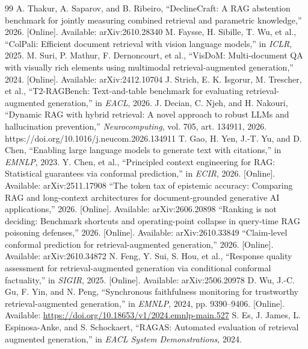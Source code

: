 \documentclass[conference]{IEEEtran}
\begin{document}
\begin{thebibliography}{99}
 A. Thakur, A. Saparov, and B. Ribeiro, ``DeclineCraft: A RAG abstention benchmark for jointly measuring combined retrieval and parametric knowledge,'' 2026. [Online]. Available: arXiv:2610.28340
 M. Faysse, H. Sibille, T. Wu, et al., ``ColPali: Efficient document retrieval with vision language models,'' in \emph{ICLR}, 2025.
 M. Suri, P. Mathur, F. Dernoncourt, et al., ``VisDoM: Multi-document QA with visually rich elements using multimodal retrieval-augmented generation,'' 2024. [Online]. Available: arXiv:2412.10704
 J. Strich, E. K. Isgorur, M. Trescher, et al., ``T2-RAGBench: Text-and-table benchmark for evaluating retrieval-augmented generation,'' in \emph{EACL}, 2026.
 J. Decian, C. Njeh, and H. Nakouri, ``Dynamic RAG with hybrid retrieval: A novel approach to robust LLMs and hallucination prevention,'' \emph{Neurocomputing}, vol. 705, art. 134911, 2026. https://doi.org/10.1016/j.neucom.2026.134911
 T. Gao, H. Yen, J.-T. Yu, and D. Chen, ``Enabling large language models to generate text with citations,'' in \emph{EMNLP}, 2023.
 Y. Chen, et al., ``Principled context engineering for RAG: Statistical guarantees via conformal prediction,'' in \emph{ECIR}, 2026. [Online]. Available: arXiv:2511.17908
 ``The token tax of epistemic accuracy: Comparing RAG and long-context architectures for document-grounded generative AI applications,'' 2026. [Online]. Available: arXiv:2606.20898
 ``Ranking is not deciding: Benchmark shortcuts and operating-point collapse in query-time RAG poisoning defenses,'' 2026. [Online]. Available: arXiv:2610.33849
 ``Claim-level conformal prediction for retrieval-augmented generation,'' 2026. [Online]. Available: arXiv:2610.34872
 N. Feng, Y. Sui, S. Hou, et al., ``Response quality assessment for retrieval-augmented generation via conditional conformal factuality,'' in \emph{SIGIR}, 2025. [Online]. Available: arXiv:2506.20978
 D. Wu, J.-C. Gu, F. Yin, and N. Peng, ``Synchronous faithfulness monitoring for trustworthy retrieval-augmented generation,'' in \emph{EMNLP}, 2024, pp. 9390--9406. [Online]. Available: \url{https://doi.org/10.18653/v1/2024.emnlp-main.527}
 S. Es, J. James, L. Espinosa-Anke, and S. Schockaert, ``RAGAS: Automated evaluation of retrieval augmented generation,'' in \emph{EACL System Demonstrations}, 2024.

\end{thebibliography}
\end{document}
